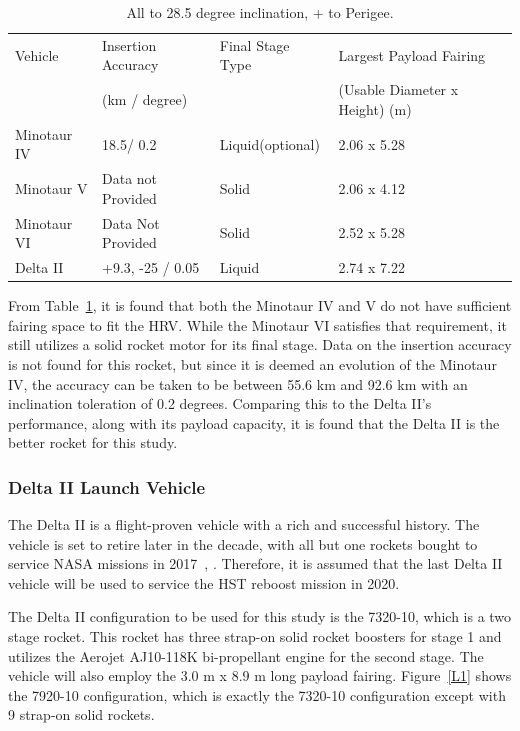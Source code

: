 \documentclass[paper=letter, fontsize=11pt]{scrartcl} %
\numberwithin{equation}{section} %
\numberwithin{figure}{section} %
\numberwithin{table}{section} %
\begin{document}
\begin{table}[H]
    \centering
    \begin{tabular}{l l l l }
        \toprule
        Vehicle     & Insertion Accuracy & Final Stage Type & Largest Payload Fairing        \\
                    & (km / degree)      &                  & (Usable Diameter x Height) (m) \\
        \midrule
        Minotaur IV & 18.5/ 0.2          & Liquid(optional) & 2.06 x 5.28                    \\
        Minotaur V  & Data not Provided  & Solid            & 2.06 x 4.12                    \\
        Minotaur VI & Data Not Provided  & Solid            & 2.52 x 5.28                    \\
        Delta II    & +9.3, -25 / 0.05   & Liquid           & 2.74 x 7.22                    \\
        \bottomrule
    \end{tabular}
    \caption{All to 28.5 degree inclination, + to Perigee.}
    \label{table:final_choices}
\end{table}

From Table~\ref{table:final_choices}, it is found that both the Minotaur IV and V do not have sufficient fairing space to fit the HRV. While the Minotaur VI satisfies that requirement, it still utilizes a solid rocket motor for its final stage. Data on the insertion accuracy is not found for this rocket, but since it is deemed an evolution of the Minotaur IV, the accuracy can be taken to be between 55.6 km and 92.6 km with an inclination toleration of 0.2 degrees. Comparing this to the Delta II's performance, along with its payload capacity, it is found that the Delta II is the better rocket for this study.

\subsubsection{Delta II Launch Vehicle}
The Delta II is a flight-proven vehicle with a rich and successful history. The vehicle is set to retire later in the decade, with all but one rockets bought to service NASA missions in 2017~\cite{ref12_11}, \cite{ref12_12}. Therefore, it is assumed that the last Delta II vehicle will be used to service the HST reboost mission in 2020.

The Delta II configuration to be used for this study is the 7320-10, which is a two stage rocket. This rocket has three strap-on solid rocket boosters for stage 1 and utilizes the Aerojet AJ10-118K bi-propellant engine for the second stage. The vehicle will also employ the 3.0 m x 8.9 m long payload fairing. Figure~\ref{L1} shows the 7920-10 configuration, which is exactly the 7320-10 configuration except with 9 strap-on solid rockets.
\end{document}
